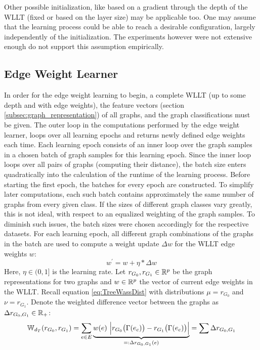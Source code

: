 	Other possible initialization, like based on a gradient through the depth of the WLLT (fixed or based on the layer size) may be applicable too.
	One may assume that the learning process could be able to reach a desirable configuration, largely independently of the initialization.
	The experiments however were not extensive enough do not support this assumption empirically.

\subsection{Edge Weight Learner} \label{subsec:EWL}
	
	In order for the edge weight learning to begin, a complete WLLT (up to some depth and with edge weights), the feature vectors (section \ref{subsec:graph_representation}) of all graphs, and the graph classifications must be given.
	The outer loop in the computations performed by the edge weight learner, loops over all learning epochs and returns newly defined edge weights each time.
	Each learning epoch consists of an inner loop over the graph samples in a chosen batch of graph samples for this learning epoch.
	Since the inner loop loops over all pairs of graphs (computing their distance), the batch size enters quadratically into the calculation of the runtime of the learning process.
	Before starting the first epoch, the batches for every epoch are constructed.
	To simplify later computations, each such batch contains approximately the same number of graphs from every given class.
	If the sizes of different graph classes vary greatly, this is not ideal, with respect to an equalized weighting of the graph samples. 
	To diminish such issues, the batch sizes were chosen accordingly for the respective datasets.
	For each learning epoch, all different graph combinations of the graphs in the batch are used to compute a  weight update $\Delta w$ for the WLLT edge weights $w$:
	\[ w^\prime = w + \eta * \Delta w \]
	Here, $\eta\in(0,1]$ is the learning rate.
	Let $r_{G_0}, r_{G_1}\in\mathbb{R}^p$ be the graph representations for two graphs and $w\in\mathbb{R}^p$ the vector of current edge weights in the WLLT.
	Recall equation \ref{eq:TreeWassDist} with distributions $\mu = r_{G_0}$ and $\nu=r_{G_1}$.	
	Denote the weighted difference vector between the graphs as $\Delta r_{G_0, G_1} \in\mathbb{R}_+$:
	\[ \mathbb{W}_{d_T}( r_{G_0}, r_{G_1} ) = \sum_{e\in E} \underbrace{ w(e) \ \Big| r_{G_0} \big( \Gamma(e_c) \big) -  r_{G_1} \big( \Gamma(e_c) \big) \Big| }_{=: \Delta r_{G_0, G_1}(e)} = \sum \Delta r_{G_0, G_1} \]
	
